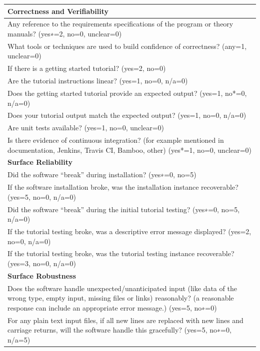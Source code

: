 \documentclass[12pt, notitlepage]{article}
\begin{document}
\begin{appendices}
\begin{singlespace}
\def\arraystretch{1.33}
\begin{tabular}{p{14cm}}
	\hline		
	\textbf{Correctness and Verifiability}\\
	\hline
	Any reference to the requirements specifications of the program or theory manuals? ({yes∗=2, no=0, unclear=0})\\
	What tools or techniques are used to build confidence of correctness? (any=1, unclear=0)\\
	If there is a getting started tutorial? ({yes=2, no=0})\\
	Are the tutorial instructions linear? ({yes=1, no=0, n/a=0})\\
	Does the getting started tutorial provide an expected output? ({yes=1, no*=0, n/a=0})\\
	Does your tutorial output match the expected output? ({yes=1, no=0, n/a=0})\\
	Are unit tests available?  ({yes=1, no=0, unclear=0})\\
	Is there evidence of continuous integration? (for example mentioned in documentation, Jenkins, Travis CI, Bamboo, other) ({yes*=1, no=0, unclear=0})\\
	\hline	
	\textbf{Surface Reliability}\\
	\hline
	Did the software “break” during installation? ({yes∗=0, no=5})\\
	If the software installation broke, was the installation instance recoverable? ({yes=5, no=0, n/a=0})\\
	Did the software “break” during the initial tutorial testing? ({yes∗=0, no=5, n/a=0})\\
	If the tutorial testing broke, was a descriptive error message displayed? ({yes=2, no=0, n/a=0})\\
	If the tutorial testing broke, was the tutorial testing instance recoverable? ({yes=3, no=0, n/a=0})\\
	\hline		
	\textbf{Surface Robustness}\\
	\hline
	Does the software handle unexpected/unanticipated input (like data of the wrong type, empty input, missing files or links) reasonably? (a reasonable response can include an appropriate error message.) ({yes=5, no∗=0})\\
	For any plain text input files, if all new lines are replaced with new lines and carriage returns, will the software handle this gracefully? ({yes=5, no∗=0, n/a=5})\\
	\hline		
\end{tabular}


\end{singlespace}
\end{appendices}
\end{document}
